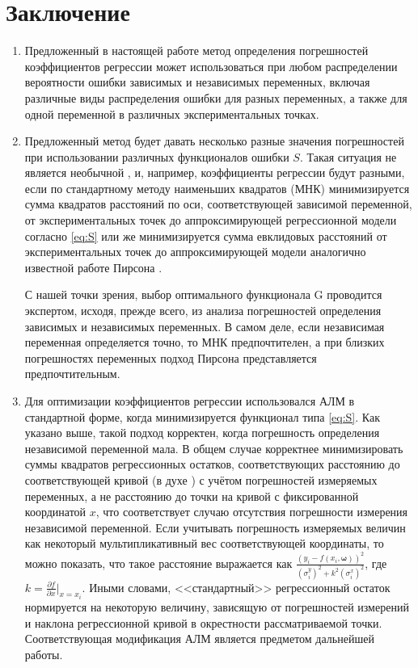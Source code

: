 \documentclass[11pt,a4paper]{article}
\theoremstyle{definition}
\begin{document}
\section{Заключение}

\begin{enumerate}
  \item Предложенный в настоящей работе метод определения погрешностей
	коэффициентов регрессии может использоваться при любом распределении
    вероятности ошибки зависимых и независимых переменных,
    включая различные виды распределения ошибки для разных переменных, а
    также для одной переменной в различных экспериментальных точках.
  \item Предложенный метод будет давать несколько разные значения погрешностей при
    использовании различных функционалов ошибки $S$. Такая ситуация
	не является необычной \cite{Rudoy13}, и, например, коэффициенты регрессии будут разными,
    если по стандартному методу наименьших квадратов (МНК) минимизируется
    сумма квадратов расстояний по оси, соответствующей зависимой переменной, от экспериментальных точек до
	аппроксимирующей регрессионной модели согласно \eqref{eq:S} или же минимизируется сумма
    евклидовых расстояний от экспериментальных точек до аппроксимирующей
	модели аналогично известной работе Пирсона \cite{pearson1901}.

	С нашей точки зрения, выбор оптимального функционала G
	проводится экспертом, исходя, прежде всего, из анализа погрешностей
	определения зависимых и независимых переменных. В самом деле, если
	независимая переменная определяется точно, то МНК предпочтителен, а при
	близких погрешностях переменных подход Пирсона представляется
	предпочтительным.
  \item Для оптимизации коэффициентов регрессии использовался
	АЛМ в стандартной форме, когда минимизируется функционал типа \eqref{eq:S}. Как
	указано выше, такой подход корректен, когда погрешность определения независимой
	переменной мала. В общем случае корректнее минимизировать суммы квадратов регрессионных остатков,
	соответствующих расстоянию до соответствующей кривой (в духе \cite{pearson1901}) с учётом
	погрешностей измеряемых переменных, а не расстоянию до точки на кривой
	с фиксированной координатой $x$, что соответствует случаю отсутствия погрешности
	измерения независимой переменной. Если учитывать погрешность измеряемых величин
	как некоторый мультипликативный вес соответствующей координаты, то можно показать, что такое расстояние выражается как
	$\frac{(y_i - f(x_i, \boldsymbol{\omega}))^2}{(\sigma^y_i)^2 + k^2 (\sigma^x_i)^2}$,
	где $k = \frac{\partial f}{\partial x} |_{x = x_i}$. Иными словами, <<стандартный>> регрессионный
	остаток нормируется на некоторую величину, зависящую от погрешностей измерений и
	наклона регрессионной кривой в окрестности рассматриваемой точки.
	Соответствующая модификация АЛМ является предметом дальнейшей работы.


\end{enumerate}
\end{document}
